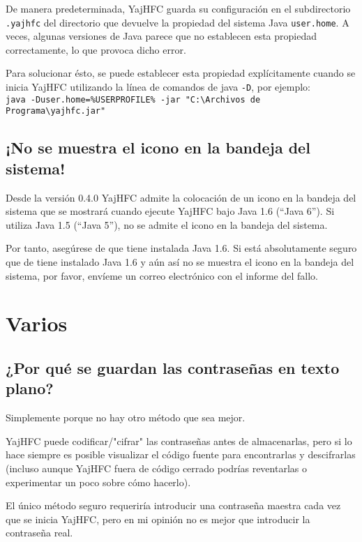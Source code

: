 \documentclass[a4paper,10pt]{scrartcl}
\begin{document}
De manera predeterminada, YajHFC guarda su configuración en el subdirectorio \texttt{.yajhfc} del directorio que devuelve
la propiedad del sistema Java \texttt{user.home}.
A veces, algunas versiones de Java parece que no establecen esta propiedad correctamente, lo que provoca dicho error.

Para solucionar ésto, se puede establecer esta propiedad explícitamente cuando se inicia YajHFC utilizando la línea de comandos de java \texttt{-D}, por ejemplo:\\
\texttt{java -Duser.home=\%USERPROFILE\% -jar "C:\textbackslash Archivos de Programa\textbackslash yajhfc.jar"}

\subsection{¡No se muestra el icono en la bandeja del sistema!}

Desde la versión 0.4.0 YajHFC admite la colocación de un icono en la bandeja del sistema que se mostrará cuando ejecute YajHFC bajo Java 1.6 (``Java 6'').
Si utiliza Java 1.5 (``Java 5''), no se admite el icono en la bandeja del sistema.

Por tanto, asegúrese de que tiene instalada Java 1.6. Si está absolutamente seguro que de tiene instalado Java 1.6 y aún así no se muestra el icono en la bandeja del sistema, por favor, envíeme un correo electrónico con el informe del fallo.


\section{Varios}

\subsection{¿Por qué se guardan las contraseñas en texto plano?}

Simplemente porque no hay otro método que sea mejor.


YajHFC puede codificar/"cifrar" las contraseñas antes de almacenarlas, 
pero si lo hace siempre es posible visualizar el código fuente para encontrarlas 
y descifrarlas (incluso aunque YajHFC fuera de código cerrado podrías reventarlas o experimentar un poco sobre cómo hacerlo).


El único método seguro requeriría introducir una contraseña maestra cada vez que se inicia YajHFC, pero en mi opinión no es mejor que introducir la contraseña real.
\end{document}
